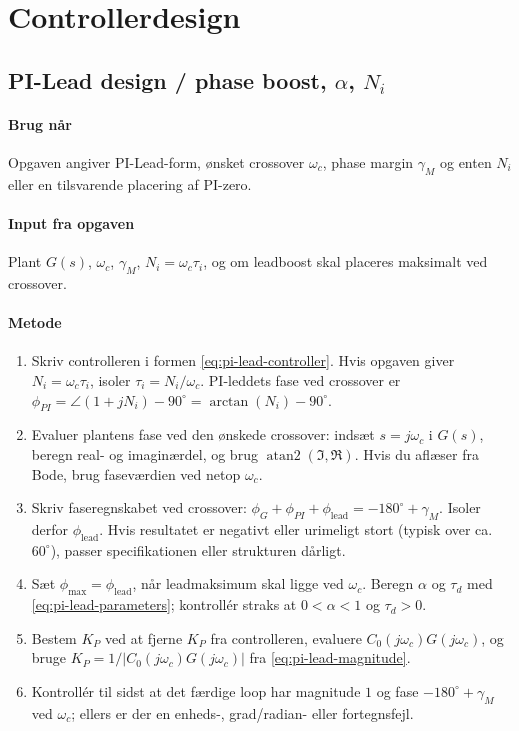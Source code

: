 \section{Controllerdesign}
\label{sec:pilead}

\subsection{PI-Lead design / phase boost, \(\alpha\), \(N_i\)}

\paragraph{Brug når}
Opgaven angiver PI-Lead-form, ønsket crossover \(\omega_c\), phase margin
\(\gamma_M\) og enten \(N_i\) eller en tilsvarende placering af PI-zero.

\paragraph{Input fra opgaven}
Plant \(G(s)\), \(\omega_c\), \(\gamma_M\), \(N_i=\omega_c\tau_i\), og om leadboost
skal placeres maksimalt ved crossover.

\paragraph{Metode}
\begin{enumerate}
\item Skriv controlleren i formen \eqref{eq:pi-lead-controller}. Hvis opgaven giver
      \(N_i=\omega_c\tau_i\), isoler \(\tau_i=N_i/\omega_c\). PI-leddets fase ved
      crossover er \(\phi_{PI}=\angle(1+jN_i)-90^\circ=\arctan(N_i)-90^\circ\).
\item Evaluer plantens fase ved den ønskede crossover: indsæt \(s=j\omega_c\) i
      \(G(s)\), beregn real- og imaginærdel, og brug \(\operatorname{atan2}(\Im,\Re)\).
      Hvis du aflæser fra Bode, brug faseværdien ved netop \(\omega_c\).
\item Skriv faseregnskabet ved crossover:
      \(\phi_G+\phi_{PI}+\phi_{\mathrm{lead}}=-180^\circ+\gamma_M\). Isoler derfor
      \(\phi_{\mathrm{lead}}\). Hvis resultatet er negativt eller urimeligt stort
      (typisk over ca. \(60^\circ\)), passer specifikationen eller strukturen dårligt.
\item Sæt \(\phi_{\max}=\phi_{\mathrm{lead}}\), når leadmaksimum skal ligge ved
      \(\omega_c\). Beregn \(\alpha\) og \(\tau_d\) med
      \eqref{eq:pi-lead-parameters}; kontrollér straks at \(0<\alpha<1\) og
      \(\tau_d>0\).
\item Bestem \(K_P\) ved at fjerne \(K_P\) fra controlleren, evaluere
      \(C_0(j\omega_c)G(j\omega_c)\), og bruge
      \(K_P=1/|C_0(j\omega_c)G(j\omega_c)|\) fra \eqref{eq:pi-lead-magnitude}.
\item Kontrollér til sidst at det færdige loop har magnitude \(1\) og fase
      \(-180^\circ+\gamma_M\) ved \(\omega_c\); ellers er der en enheds-, grad/radian-
      eller fortegnsfejl.
\end{enumerate}

